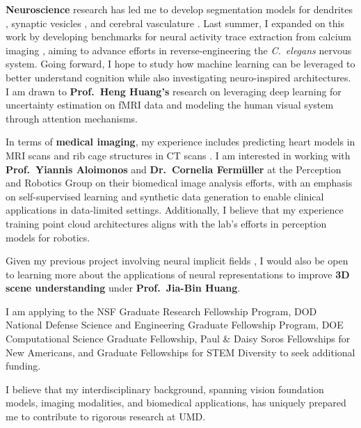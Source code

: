 \documentclass[letterpaper,11pt]{article}
\begin{document}
\textbf{Neuroscience} research has led me to develop segmentation models for dendrites , synaptic vesicles , and cerebral vasculature . Last summer, I expanded on this work by developing benchmarks for neural activity trace extraction from calcium imaging , aiming to advance efforts in reverse-engineering the \textit{C.\ elegans} nervous system. Going forward, I hope to study how machine learning can be leveraged to better understand cognition while also investigating neuro-inspired architectures. I am drawn to \textbf{Prof.\ Heng Huang’s} research on leveraging deep learning for uncertainty estimation on fMRI data and modeling the human visual system through attention mechanisms.

In terms of \textbf{medical imaging}, my experience includes predicting heart models in MRI scans  and rib cage structures in CT scans . I am interested in working with \textbf{Prof.\ Yiannis Aloimonos} and \textbf{Dr.\ Cornelia Fermüller} at the Perception and Robotics Group on their biomedical image analysis efforts, with an emphasis on self-supervised learning and synthetic data generation to enable clinical applications in data-limited settings. Additionally, I believe that my experience training point cloud architectures  aligns with the lab’s efforts in perception models for robotics.

Given my previous project involving neural implicit fields , I would also be open to learning more about the applications of neural representations to improve \textbf{3D scene understanding} under \textbf{Prof.\ Jia-Bin Huang}.

I am applying to the NSF Graduate Research Fellowship Program, DOD National Defense Science and Engineering Graduate Fellowship Program, DOE Computational Science Graduate Fellowship, Paul \& Daisy Soros Fellowships for New Americans, and Graduate Fellowships for STEM Diversity to seek additional funding.

I believe that my interdisciplinary background, spanning vision foundation models, imaging modalities, and biomedical applications, has uniquely prepared me to contribute to rigorous research at UMD.
\end{document}
